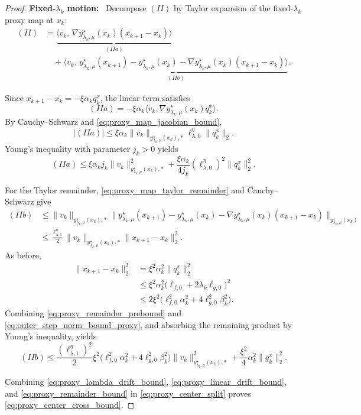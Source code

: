 \documentclass{article}
\newcommand{\proofstep}[1]{\par\smallskip\noindent\textbf{#1}\ }
\begin{document}
\begin{proof}
\proofstep{Fixed-\(\lambda_k\) motion:}
Decompose \((II)\) by Taylor expansion of the fixed-\(\lambda_k\) proxy map at \(x_k\):
\begin{align}
(II)
&=
\underbrace{
\big\langle v_k,\,
\nabla y_{\lambda_k,\mu}^\star(x_k)(x_{k+1}-x_k)
\big\rangle
}_{(IIa)}
\nonumber\\
&\quad+
\underbrace{
\Big\langle v_k,\,
y_{\lambda_k,\mu}^\star(x_{k+1})
-y_{\lambda_k,\mu}^\star(x_k)
-\nabla y_{\lambda_k,\mu}^\star(x_k)(x_{k+1}-x_k)
\Big\rangle
}_{(IIb)} .
\label{eq:proxy_x_drift_split}
\end{align}

Since \(x_{k+1}-x_k=-\xi\alpha_kq_k^x\), the linear term satisfies
\[
(IIa)
=
-\xi\alpha_k
\big\langle v_k,\nabla y_{\lambda_k,\mu}^\star(x_k)q_k^x\big\rangle .
\]
By Cauchy--Schwarz and \eqref{eq:proxy_map_jacobian_bound},
\[
|(IIa)|
\le
\xi\alpha_k
\|v_k\|_{y_{\lambda_k,\mu}^\star(x_k),*}
\ell_{\lambda,0}^\eta\|q_k^x\|_2 .
\]
Young's inequality with parameter \(j_k>0\) yields
\begin{equation}
\label{eq:proxy_linear_drift_bound}
(IIa)
\le
\xi\alpha_kj_k
\|v_k\|_{y_{\lambda_k,\mu}^\star(x_k),*}^2
+
\frac{\xi\alpha_k}{4j_k}
(\ell_{\lambda,0}^\eta)^2
\|q_k^x\|_2^2 .
\end{equation}

For the Taylor remainder, \eqref{eq:proxy_map_taylor_remainder} and Cauchy--Schwarz give
\begin{align}
(IIb)
&\le
\|v_k\|_{y_{\lambda_k,\mu}^\star(x_k),*}
\Big\|
y_{\lambda_k,\mu}^\star(x_{k+1})
-y_{\lambda_k,\mu}^\star(x_k)
-\nabla y_{\lambda_k,\mu}^\star(x_k)(x_{k+1}-x_k)
\Big\|_{y_{\lambda_k,\mu}^\star(x_k)}
\nonumber\\
&\le
\frac{\ell_{\lambda,1}^\eta}{2}
\|v_k\|_{y_{\lambda_k,\mu}^\star(x_k),*}
\|x_{k+1}-x_k\|_2^2 .
\label{eq:proxy_remainder_prebound}
\end{align}
As before,
\begin{align}
\|x_{k+1}-x_k\|_2^2
&=
\xi^2\alpha_k^2\|q_k^x\|_2^2
\nonumber\\
&\le
\xi^2\alpha_k^2
\bigl(\ell_{f,0}+2\lambda_k\ell_{g,0}\bigr)^2
\nonumber\\
&\le
2\xi^2
\bigl(\ell_{f,0}^2\alpha_k^2+4\ell_{g,0}^2\beta_k^2\bigr).
\label{eq:outer_step_norm_bound_proxy}
\end{align}
Combining \eqref{eq:proxy_remainder_prebound} and \eqref{eq:outer_step_norm_bound_proxy}, and
absorbing the remaining product by Young's inequality, yields
\begin{equation}
\label{eq:proxy_remainder_bound}
(IIb)
\le
\frac{(\ell_{\lambda,1}^\eta)^2}{2}\xi^2
\bigl(\ell_{f,0}^2\alpha_k^2+4\ell_{g,0}^2\beta_k^2\bigr)
\|v_k\|_{y_{\lambda_k,\mu}^\star(x_k),*}^2
+
\frac{\xi^2}{4}\alpha_k^2\|q_k^x\|_2^2 .
\end{equation}

Combining \eqref{eq:proxy_lambda_drift_bound}, \eqref{eq:proxy_linear_drift_bound}, and
\eqref{eq:proxy_remainder_bound} in \eqref{eq:proxy_center_split} proves
\eqref{eq:proxy_center_cross_bound}.
\end{proof}





% 
\end{document}
